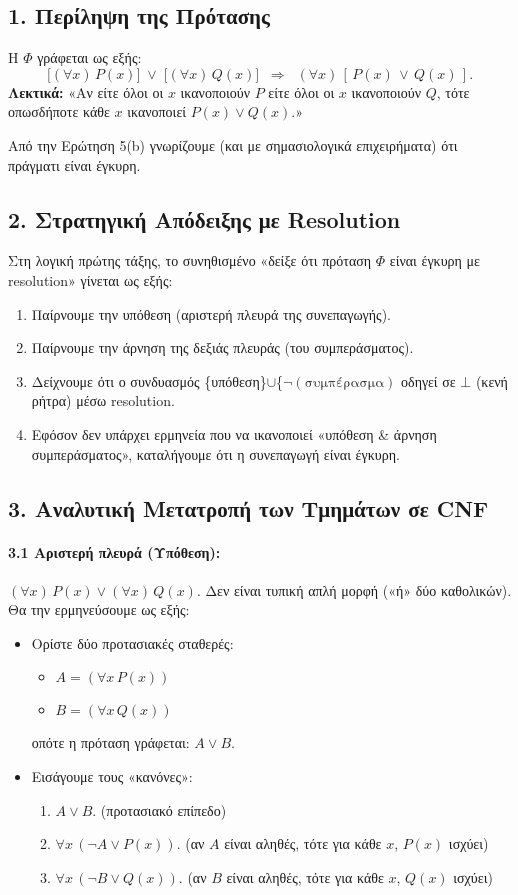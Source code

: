 \documentclass[a4paper,12pt]{article}
\begin{document}
\subsection*{1. Περίληψη της Πρότασης}
Η $\Phi$ γράφεται ως εξής:
\[
\bigl[(\forall x)\,P(x)\bigr]\;\lor\;\bigl[(\forall x)\,Q(x)\bigr] \;\;\Longrightarrow\;\; (\forall x)\,[\,P(x)\,\lor\,Q(x)\,].
\]
\textbf{Λεκτικά:} «Αν είτε όλοι οι $x$ ικανοποιούν $P$ είτε όλοι οι $x$ ικανοποιούν $Q$, τότε οπωσδήποτε κάθε $x$ ικανοποιεί $P(x)\lor Q(x)$.»

Από την Ερώτηση 5(b) γνωρίζουμε (και με σημασιολογικά επιχειρήματα) ότι πράγματι είναι έγκυρη.

\subsection*{2. Στρατηγική Απόδειξης με Resolution}
Στη λογική πρώτης τάξης, το συνηθισμένο «δείξε ότι πρόταση $\Phi$ είναι έγκυρη με resolution» γίνεται ως εξής:
\begin{enumerate}
    \item Παίρνουμε την υπόθεση (αριστερή πλευρά της συνεπαγωγής).
    \item Παίρνουμε την άρνηση της δεξιάς πλευράς (του συμπεράσματος).
    \item Δείχνουμε ότι ο συνδυασμός \{υπόθεση\}$\cup$\{$\neg (\text{συμπέρασμα})$  οδηγεί σε $\bot$ (κενή ρήτρα) μέσω resolution.
    \item Εφόσον δεν υπάρχει ερμηνεία που να ικανοποιεί «υπόθεση \& άρνηση συμπεράσματος», καταλήγουμε ότι η συνεπαγωγή είναι έγκυρη.
\end{enumerate}

\subsection*{3. Αναλυτική Μετατροπή των Τμημάτων σε CNF}
\paragraph{3.1 Αριστερή πλευρά (Υπόθεση):}
$(\forall x)\,P(x) \lor (\forall x)\,Q(x).$
Δεν είναι τυπική απλή μορφή («ή» δύο καθολικών). Θα την ερμηνεύσουμε ως εξής:
\begin{itemize}
    \item Ορίστε δύο προτασιακές σταθερές: 
    \begin{itemize}
\item $A = (\forall x\,P(x))$
\item $B = (\forall x\,Q(x))$
    \end{itemize}
    οπότε η πρόταση γράφεται: $A \lor B$.
    \item Εισάγουμε τους «κανόνες»: 
    \begin{enumerate}
        \item $A \lor B.$ (προτασιακό επίπεδο)
        \item $\forall x\,(\neg A \lor P(x)).$ (αν $A$ είναι αληθές, τότε για κάθε $x$, $P(x)$ ισχύει)
        \item $\forall x\,(\neg B \lor Q(x)).$ (αν $B$ είναι αληθές, τότε για κάθε $x$, $Q(x)$ ισχύει)
    \end{enumerate}
\end{itemize}
\end{document}
